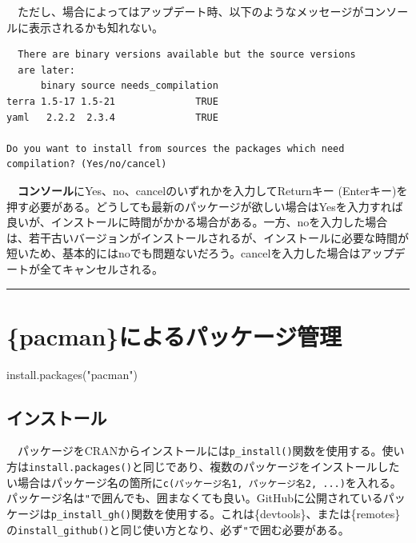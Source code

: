 \documentclass[
  a4paper,
  pandoc,
  ja=standard,
  jafont=haranoaji]{bxjsbook}
\newenvironment{Shaded}{\begin{snugshade}}{\end{snugshade}}
\newcommand{\FunctionTok}[1]{\textcolor[rgb]{0.28,0.35,0.67}{#1}}
\newcommand{\NormalTok}[1]{\textcolor[rgb]{0.00,0.48,0.65}{#1}}
\newcommand{\StringTok}[1]{\textcolor[rgb]{0.13,0.47,0.30}{#1}}
\begin{document}
　ただし、場合によってはアップデート時、以下のようなメッセージがコンソールに表示されるかも知れない。

\begin{verbatim}
  There are binary versions available but the source versions
  are later:
      binary source needs_compilation
terra 1.5-17 1.5-21              TRUE
yaml   2.2.2  2.3.4              TRUE

Do you want to install from sources the packages which need compilation? (Yes/no/cancel)
\end{verbatim}

　\textbf{コンソール}にYes、no、cancelのいずれかを入力してReturnキー
(Enterキー)を押す必要がある。どうしても最新のパッケージが欲しい場合はYesを入力すれば良いが、インストールに時間がかかる場合がある。一方、noを入力した場合は、若干古いバージョンがインストールされるが、インストールに必要な時間が短いため、基本的にはnoでも問題ないだろう。cancelを入力した場合はアップデートが全てキャンセルされる。

\begin{center}\rule{0.5\linewidth}{0.5pt}\end{center}

\hypertarget{sec-packages_pacman}{%
\section{\{pacman\}によるパッケージ管理}\label{sec-packages_pacman}}

\begin{Shaded}
\begin{Highlighting}[numbers=left,,]
\FunctionTok{install.packages}\NormalTok{(}\StringTok{"pacman"}\NormalTok{)}
\end{Highlighting}
\end{Shaded}

\hypertarget{ux30a4ux30f3ux30b9ux30c8ux30fcux30eb}{%
\subsection{インストール}\label{ux30a4ux30f3ux30b9ux30c8ux30fcux30eb}}

　パッケージをCRANからインストールには\texttt{p\_install()}関数を使用する。使い方は\texttt{install.packages()}と同じであり、複数のパッケージをインストールしたい場合はパッケージ名の箇所に\texttt{c(パッケージ名1,\ パッケージ名2,\ ...)}を入れる。パッケージ名は\texttt{"}で囲んでも、囲まなくても良い。GitHubに公開されているパッケージは\texttt{p\_install\_gh()}関数を使用する。これは\{devtools\}、または\{remotes\}の\texttt{install\_github()}と同じ使い方となり、必ず\texttt{"}で囲む必要がある。
\end{document}
